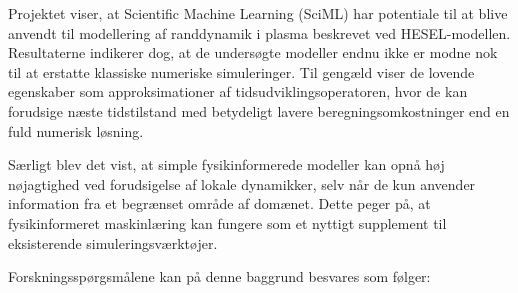 Projektet viser, at Scientific Machine Learning (SciML) har potentiale til at blive anvendt til modellering af randdynamik i plasma beskrevet ved HESEL-modellen. Resultaterne indikerer dog, at de undersøgte modeller endnu ikke er modne nok til at erstatte klassiske numeriske simuleringer. Til gengæld viser de lovende egenskaber som approksimationer af tidsudviklingsoperatoren, hvor de kan forudsige næste tidstilstand med betydeligt lavere beregningsomkostninger end en fuld numerisk løsning.

Særligt blev det vist, at simple fysikinformerede modeller kan opnå høj nøjagtighed ved forudsigelse af lokale dynamikker, selv når de kun anvender information fra et begrænset område af domænet. Dette peger på, at fysikinformeret maskinlæring kan fungere som et nyttigt supplement til eksisterende simuleringsværktøjer.

Forskningsspørgsmålene kan på denne baggrund besvares som følger:

